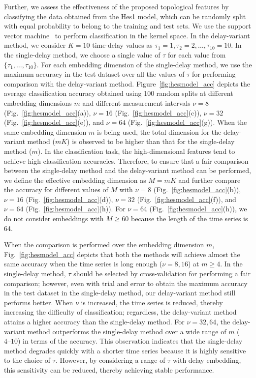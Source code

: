 \documentclass[twocolumn,pre,amsmath,amssymb]{revtex4-1}
\begin{document}
Further, we assess the effectiveness of the proposed topological features by classifying the data obtained from the Hes1 model, which can be randomly split with equal probability to belong to the training and test sets.
We use the support vector machine~\cite{prml:bishop:2006} to perform classification in the kernel space. 
In the delay-variant method, we consider $K=10$ time-delay values as $\tau_1=1,\tau_2=2,\ldots,\tau_{10}=10$.
In the single-delay method, we choose a single value of $\tau$ for each value from $\{\tau_1,\ldots,\tau_{10} \}$.
For each embedding dimension of the single-delay method, 
we use the maximum accuracy in the test dataset over 
all the values of $\tau$ for performing comparison with the delay-variant method.
Figure~\ref{fig:hesmodel_acc} depicts the average classification accuracy obtained using 100 random splits 
at different embedding dimensions $m$ and different measurement intervals 
$\nu=8$ (Fig.~\ref{fig:hesmodel_acc}(a)), $\nu=16$ (Fig.~\ref{fig:hesmodel_acc}(c)), 
$\nu=32$ (Fig.~\ref{fig:hesmodel_acc}(e)), and $\nu=64$ (Fig.~\ref{fig:hesmodel_acc}(g)).
When the same embedding dimension $m$ is being used, the total dimension for 
the delay-variant method ($mK$) is observed to be higher than that for the single-delay method ($m$). 
In the classification task, the high-dimensional features tend to achieve high classification accuracies. 
Therefore, to ensure that a fair comparison between the single-delay method and the delay-variant method can be performed, 
we define the effective embedding dimension as $M=mK$ 
and further compare the accuracy for different values of $M$ with $\nu=8$ (Fig.~\ref{fig:hesmodel_acc}(b)), $\nu=16$ (Fig.~\ref{fig:hesmodel_acc}(d)), 
$\nu=32$ (Fig.~\ref{fig:hesmodel_acc}(f)),
and $\nu=64$ (Fig.~\ref{fig:hesmodel_acc}(h)).
For $\nu=64$ (Fig.~\ref{fig:hesmodel_acc}(h)), 
we do not consider embeddings with $M \geq 60$ 
because the length of the time series is 64.

When the comparison is performed over the embedding dimension $m$, 
Fig.~\ref{fig:hesmodel_acc} depicts that 
both the methods will achieve almost the same accuracy
when the time series is long enough ($\nu=8, 16$) at $m \geq 4$.
In the single-delay method, 
$\tau$ should be selected by cross-validation for performing a fair comparison;
however, even with trial and error to obtain the maximum accuracy in the test dataset
in the single-delay method,
our delay-variant method still performs better.
When $\nu$ is increased, the time series is reduced, 
thereby increasing the difficulty of classification;
regardless, the delay-variant method attains a higher accuracy than the single-delay method.
For $\nu=32, 64$, the delay-variant method outperforms the single-delay method 
over a wide range of $m$ ($4\text{--}10$) in terms of the accuracy. 
This observation indicates that the single-delay method degrades quickly
with a shorter time series because it is highly sensitive to the choice of $\tau$.
However, by considering a range of $\tau$ with delay embedding,
this sensitivity can be reduced, thereby achieving stable performance.
\end{document}
